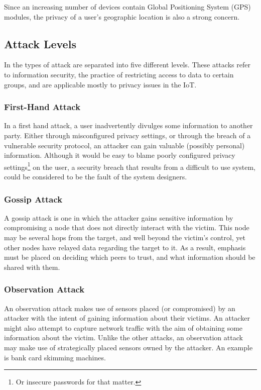 \documentclass[10pt,journal,compsoc]{IEEEtran}
\begin{document}
Since an increasing number of devices contain Global Positioning System (GPS)
modules, the privacy of a user's geographic location is also a strong concern.

\subsection{Attack Levels}
In \cite{Elkhodr2013} the types of attack are separated into five different
levels. These attacks refer to information security, the practice of
restricting access to data to certain groups, and are applicable mostly to
privacy issues in the IoT.

\subsubsection{First-Hand Attack}
In a first hand attack, a user inadvertently divulges some information to
another party. Either through misconfigured privacy settings, or through the
breach of a vulnerable security protocol, an attacker can gain valuable
(possibly personal) information. Although it would be easy to blame poorly
configured privacy settings\footnote{Or insecure passwords for that matter.} on
the user, a security breach that results from a difficult to use
system, could be considered to be the fault of the system designers. 

\subsubsection{Gossip Attack}
A gossip attack is one in which the attacker gains sensitive information by
compromising a node that does not directly interact with the victim. This node
may be several hops from the target, and well beyond the victim's control, yet
other nodes have relayed data regarding the target to it.  As a result,
emphasis must be placed on deciding which peers to trust, and what information
should be shared with them.

\subsubsection{Observation Attack}
An observation attack makes use of sensors placed (or compromised) by an
attacker with the intent of gaining information about their victims. An
attacker might also attempt to capture network traffic with the aim of
obtaining some information about the victim. Unlike the other attacks, an
observation attack may make use of strategically placed sensors owned by the
attacker. An example is bank card skimming machines. 
\end{document}
